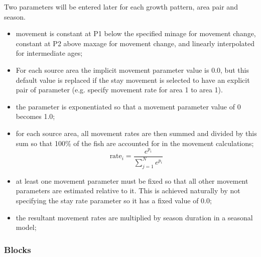 Two parameters will be entered later for each growth pattern, area pair and season.   
\begin{itemize}
	\item movement is constant at P1 below the specified minage for movement change, constant at P2 above maxage for movement change, and linearly interpolated for intermediate ages;
	\item For each source area the implicit movement parameter value is 0.0, but this default value is replaced if the stay movement is selected to have an explicit pair of parameter (e.g. specify movement rate for area 1 to area 1).
	\item the parameter is exponentiated so that a movement parameter value of 0 becomes 1.0;
	\item for each source area, all movement rates are then summed and divided by this sum so that 100\% of the fish are accounted for in the movement calculations;
	\begin{equation}
	\text{rate}_i = \frac{e^{p_i}}{\sum_{j=1}^{N}e^{p_i}}
	\end{equation}
	\item at least one movement parameter must be fixed so that all other movement parameters are estimated relative to it.  This is achieved naturally by not specifying the stay rate parameter so it has a fixed value of 0.0;
	\item the resultant movement rates are multiplied by season duration in a seasonal model;
	
\end{itemize}


\subsubsection{Blocks}
	
